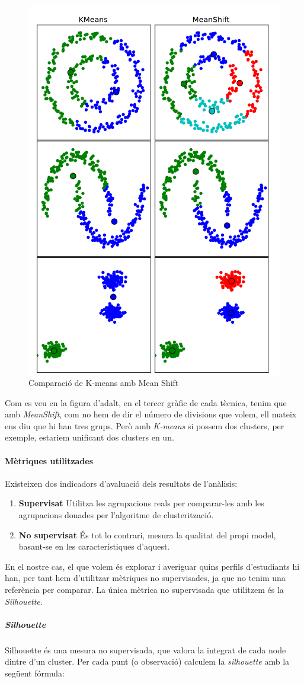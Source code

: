 \documentclass[12pt,a4paper,catalan]{article}
\begin{document}
\begin{figure}[h]
\centering
\includegraphics[width=.4\linewidth]{img/kmeansVsMeanshift.png}
\caption{Comparació de K-means amb Mean Shift \cite{comp-meanshift-kmeans}}
\end{figure}

Com es veu en la figura d'adalt, en el tercer gràfic de cada tècnica, tenim que amb \textit{MeanShift}, com no hem de dir el número de divisions que volem, ell mateix ens diu que hi han tres grups. Però amb \textit{K-means} si possem dos clusters, per exemple, estariem unificant dos clusters en un.

\newpage

\paragraph{Mètriques utilitzades}
Existeixen dos indicadors d'avaluació dels resultats de l'anàlisis:
\begin{enumerate}
	\item \textbf{Supervisat} Utilitza les agrupacions reals per comparar-les amb les agrupacions donades per l'algoritme de clusterització.
	\item \textbf{No supervisat} És tot lo contrari, mesura la qualitat del propi model, basant-se en les característiques d'aquest.
\end{enumerate}

En el nostre cas, el que volem és explorar i averiguar quins perfils d'estudiants hi han, per tant hem d'utilitzar mètriques no supervisades, ja que no tenim una referència per comparar. La única mètrica no supervisada que utilitzem és la \textit{Silhouette}.

\subparagraph{\textit{Silhouette}}
Silhouette \cite{silhouette} és una mesura no supervisada, que valora la integrat de cada node dintre d'un cluster. Per cada punt (o observació) calculem la \textit{silhouette} amb la següent fórmula:
\end{document}
